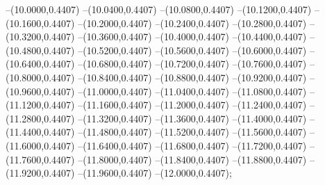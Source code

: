 {	--(10.0000,0.4407)
	--(10.0400,0.4407)
	--(10.0800,0.4407)
	--(10.1200,0.4407)
	--(10.1600,0.4407)
	--(10.2000,0.4407)
	--(10.2400,0.4407)
	--(10.2800,0.4407)
	--(10.3200,0.4407)
	--(10.3600,0.4407)
	--(10.4000,0.4407)
	--(10.4400,0.4407)
	--(10.4800,0.4407)
	--(10.5200,0.4407)
	--(10.5600,0.4407)
	--(10.6000,0.4407)
	--(10.6400,0.4407)
	--(10.6800,0.4407)
	--(10.7200,0.4407)
	--(10.7600,0.4407)
	--(10.8000,0.4407)
	--(10.8400,0.4407)
	--(10.8800,0.4407)
	--(10.9200,0.4407)
	--(10.9600,0.4407)
	--(11.0000,0.4407)
	--(11.0400,0.4407)
	--(11.0800,0.4407)
	--(11.1200,0.4407)
	--(11.1600,0.4407)
	--(11.2000,0.4407)
	--(11.2400,0.4407)
	--(11.2800,0.4407)
	--(11.3200,0.4407)
	--(11.3600,0.4407)
	--(11.4000,0.4407)
	--(11.4400,0.4407)
	--(11.4800,0.4407)
	--(11.5200,0.4407)
	--(11.5600,0.4407)
	--(11.6000,0.4407)
	--(11.6400,0.4407)
	--(11.6800,0.4407)
	--(11.7200,0.4407)
	--(11.7600,0.4407)
	--(11.8000,0.4407)
	--(11.8400,0.4407)
	--(11.8800,0.4407)
	--(11.9200,0.4407)
	--(11.9600,0.4407)
	--(12.0000,0.4407);
}
